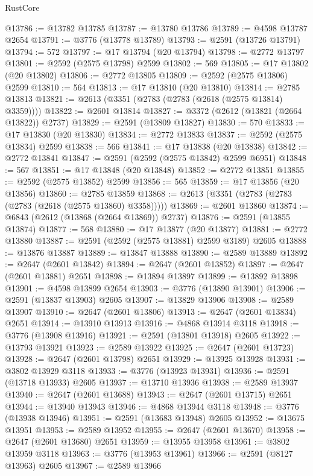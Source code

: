 \begin{lexlean}{RustCore}
\begin{coremodule}
@13786 := @13782 @13785
@13787 := @13780 @13786
@13789 := @4598 @13787 @2654
@13791 := @3776 (@13778 @13789)
@13793 := @2591 (@13726 @13791)
@13794 := 572
@13797 := @17 @13794 (@20 @13794)
@13798 := @2772 @13797
@13801 := @2592 (@2575 @13798) @2599
@13802 := 569
@13805 := @17 @13802 (@20 @13802)
@13806 := @2772 @13805
@13809 := @2592 (@2575 @13806) @2599
@13810 := 564
@13813 := @17 @13810 (@20 @13810)
@13814 := @2785 @13813
@13821 := @2613 (@3351 (@2783 (@2783 (@2618 (@2575 @13814) @3359))))
@13822 := @2601 @13814
@13827 := @3372 (@2612 (@13821 (@2664 @13822)) @2737)
@13829 := @2591 (@13809 @13827)
@13830 := 570
@13833 := @17 @13830 (@20 @13830)
@13834 := @2772 @13833
@13837 := @2592 (@2575 @13834) @2599
@13838 := 566
@13841 := @17 @13838 (@20 @13838)
@13842 := @2772 @13841
@13847 := @2591 (@2592 (@2575 @13842) @2599 @6951)
@13848 := 567
@13851 := @17 @13848 (@20 @13848)
@13852 := @2772 @13851
@13855 := @2592 (@2575 @13852) @2599
@13856 := 565
@13859 := @17 @13856 (@20 @13856)
@13860 := @2785 @13859
@13868 := @2613 (@3351 (@2783 (@2783 (@2783 (@2618 (@2575 @13860) @3358)))))
@13869 := @2601 @13860
@13874 := @6843 (@2612 (@13868 (@2664 @13869)) @2737)
@13876 := @2591 (@13855 @13874)
@13877 := 568
@13880 := @17 @13877 (@20 @13877)
@13881 := @2772 @13880
@13887 := @2591 (@2592 (@2575 @13881) @2599 @3189) @2605
@13888 := @13876 @13887
@13889 := @13847 @13888
@13890 := @2589 @13889
@13892 := @2647 (@2601 @13842)
@13894 := @2647 (@2601 @13852)
@13897 := @2647 (@2601 @13881) @2651
@13898 := @13894 @13897
@13899 := @13892 @13898
@13901 := @4598 @13899 @2654
@13903 := @3776 (@13890 @13901)
@13906 := @2591 (@13837 @13903) @2605
@13907 := @13829 @13906
@13908 := @2589 @13907
@13910 := @2647 (@2601 @13806)
@13913 := @2647 (@2601 @13834) @2651
@13914 := @13910 @13913
@13916 := @4868 @13914 @3118
@13918 := @3776 (@13908 @13916)
@13921 := @2591 (@13801 @13918) @2605
@13922 := @13793 @13921
@13923 := @2589 @13922
@13925 := @2647 (@2601 @13723)
@13928 := @2647 (@2601 @13798) @2651
@13929 := @13925 @13928
@13931 := @3802 @13929 @3118
@13933 := @3776 (@13923 @13931)
@13936 := @2591 (@13718 @13933) @2605
@13937 := @13710 @13936
@13938 := @2589 @13937
@13940 := @2647 (@2601 @13688)
@13943 := @2647 (@2601 @13715) @2651
@13944 := @13940 @13943
@13946 := @4868 @13944 @3118
@13948 := @3776 (@13938 @13946)
@13951 := @2591 (@13683 @13948) @2605
@13952 := @13675 @13951
@13953 := @2589 @13952
@13955 := @2647 (@2601 @13670)
@13958 := @2647 (@2601 @13680) @2651
@13959 := @13955 @13958
@13961 := @3802 @13959 @3118
@13963 := @3776 (@13953 @13961)
@13966 := @2591 (@8127 @13963) @2605
@13967 := @2589 @13966

\end{coremodule}
\end{lexlean}
